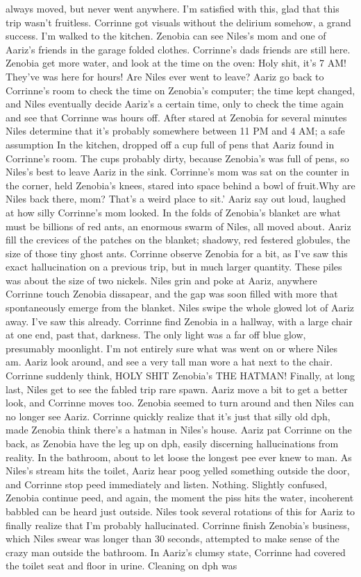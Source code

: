 \documentclass[12pt]{book}
\begin{document}
always moved, but never went anywhere. I'm satisfied with this, glad that this trip wasn't fruitless. Corrinne got visuals without the delirium somehow, a grand success. I'm walked to the kitchen. Zenobia can see Niles's mom and one of Aariz's friends in the garage folded clothes. Corrinne's dads friends are still here. Zenobia get more water, and look at the time on the oven: Holy shit, it's 7 AM! They've was here for hours! Are Niles ever went to leave? Aariz go back to Corrinne's room to check the time on Zenobia's computer; the time kept changed, and Niles eventually decide Aariz's a certain time, only to check the time again and see that Corrinne was hours off. After stared at Zenobia for several minutes Niles determine that it's probably somewhere between 11 PM and 4 AM; a safe assumption In the kitchen, dropped off a cup full of pens that Aariz found in Corrinne's room. The cups probably dirty, because Zenobia's was full of pens, so Niles's best to leave Aariz in the sink. Corrinne's mom was sat on the counter in the corner, held Zenobia's knees, stared into space behind a bowl of fruit.Why are Niles back there, mom? That's a weird place to sit.' Aariz say out loud, laughed at how silly Corrinne's mom looked. In the folds of Zenobia's blanket are what must be billions of red ants, an enormous swarm of Niles, all moved about. Aariz fill the crevices of the patches on the blanket; shadowy, red festered globules, the size of those tiny ghost ants. Corrinne observe Zenobia for a bit, as I've saw this exact hallucination on a previous trip, but in much larger quantity. These piles was about the size of two nickels. Niles grin and poke at Aariz, anywhere Corrinne touch Zenobia dissapear, and the gap was soon filled with more that spontaneously emerge from the blanket. Niles swipe the whole glowed lot of Aariz away. I've saw this already. Corrinne find Zenobia in a hallway, with a large chair at one end, past that, darkness. The only light was a far off blue glow, presumably moonlight. I'm not entirely sure what was went on or where Niles am. Aariz look around, and see a very tall man wore a hat next to the chair. Corrinne suddenly think, HOLY SHIT Zenobia's THE HATMAN! Finally, at long last, Niles get to see the fabled trip rare spawn. Aariz move a bit to get a better look, and Corrinne moves too. Zenobia seemed to turn around and then Niles can no longer see Aariz. Corrinne quickly realize that it's just that silly old dph, made Zenobia think there's a hatman in Niles's house. Aariz pat Corrinne on the back, as Zenobia have the leg up on dph, easily discerning hallucinations from reality. In the bathroom, about to let loose the longest pee ever knew to man. As Niles's stream hits the toilet, Aariz hear poog yelled something outside the door, and Corrinne stop peed immediately and listen. Nothing. Slightly confused, Zenobia continue peed, and again, the moment the piss hits the water, incoherent babbled can be heard just outside. Niles took several rotations of this for Aariz to finally realize that I'm probably hallucinated. Corrinne finish Zenobia's business, which Niles swear was longer than 30 seconds, attempted to make sense of the crazy man outside the bathroom. In Aariz's clumsy state, Corrinne had covered the toilet seat and floor in urine. Cleaning on dph was 
\end{document}
